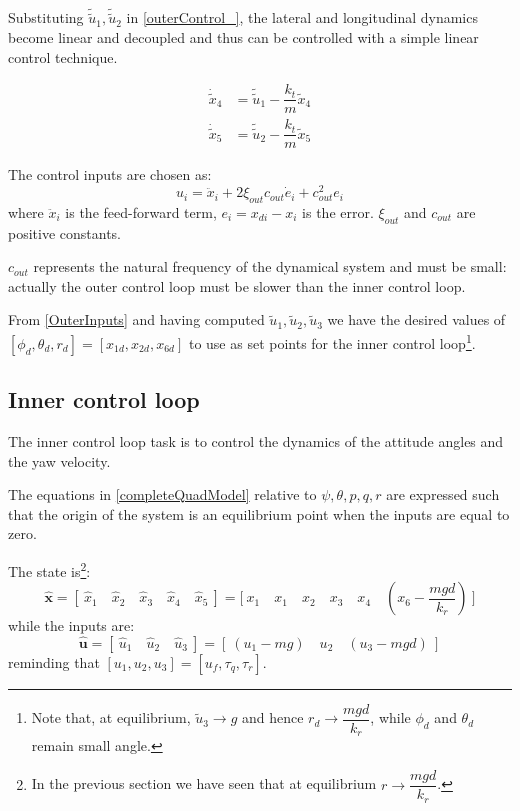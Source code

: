 \documentclass[11pt,a4paper]{scrartcl}
\begin{document}
Substituting $ \tilde{\tilde{u}}_1, \tilde{\tilde{u}}_2 $ in \eqref{outerControl_}, the lateral and longitudinal dynamics become linear and decoupled and thus can be controlled with a simple linear control technique.

\begin{subequations}
	\begin{align}
		\dot{\tilde{x}}_4 & = \tilde{\tilde{u}}_1 - \dfrac{k_t}{m} \tilde{x}_4 \\
		\dot{\tilde{x}}_5 & = \tilde{\tilde{u}}_2 - \dfrac{k_t}{m} \tilde{x}_5
	\end{align}
\end{subequations}

The control inputs are chosen as:
\begin{equation}
	u_i = \ddot{x}_i + 2\xi_{out}c_{out} \dot{e}_i + c_{out}^2 e_i 
\end{equation}
where $ \ddot{x}_i $ is the feed-forward term, $ e_i = x_{di} - x_i $ is the error. $ \xi_{out} $ and $ c_{out} $ are positive constants. 

$ c_{out} $ represents the natural frequency of the dynamical system and must be small: actually the outer control loop must be slower than the inner control loop. 

From \eqref{OuterInputs} and having computed $ \tilde{u}_1, \tilde{u}_2, \tilde{u}_3 $ we have the desired values of $ [\phi_d, \theta_d, r_d]=[x_{1d}, x_{2d}, x_{6d}] $ to use as set points for the inner control loop\footnote{Note that, at equilibrium, $ \tilde{u}_3 \rightarrow g $ and hence $ r_d \rightarrow \dfrac{mgd}{k_r} $, while $ \phi_d $ and $ \theta_d $ remain small angle.}. 


\subsection{Inner control loop}

The inner control loop task is to control the dynamics of the attitude angles and the yaw velocity.

The equations in \eqref{completeQuadModel} relative to $ \psi, \theta, p, q, r $ are expressed such that the origin of the system is an equilibrium point when the inputs are equal to zero.

The state is\footnote{In the previous section we have seen that at equilibrium $ r \rightarrow \dfrac{mgd}{k_r} $. }:
\begin{equation}
	\mathbf{\hat{x}} = [ \ \hat{x}_1 \quad \hat{x}_2 \quad \hat{x}_3 \quad \hat{x}_4 \quad \hat{x}_5 \ ] = \Big[ \ x_1 \quad x_1 \quad x_2 \quad x_3 \quad x_4 \quad (x_6-\dfrac{mgd}{k_r}) \ \Big]	
\end{equation}
while the inputs are:
\begin{equation}
	\mathbf{\hat{u}} = [ \ \hat{u}_1 \quad \hat{u}_2 \quad \hat{u}_3 \ ] = [ \ (u_1 -mg) \quad u_2 \quad (u_3 - mgd) \ ]
\end{equation}
reminding that $ [u_1, u_2, u_3] = [u_f, \tau_q, \tau_r ]  $.
\end{document}

